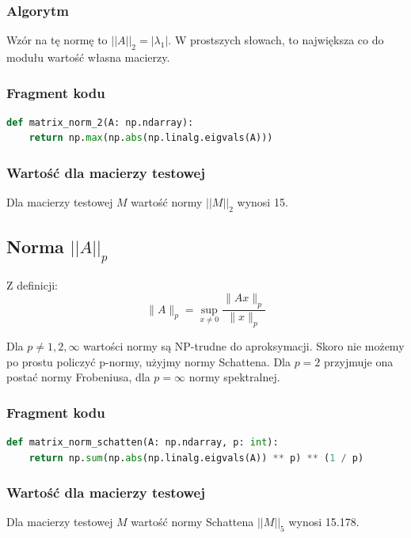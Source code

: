 \documentclass[a4paper]{article}
\begin{document}
\subsubsection{Algorytm}
Wzór na tę normę to
$||A||_2 = |{\lambda_{1}}|$. W prostszych słowach, to największa
co do modułu wartość własna macierzy.

\subsubsection{Fragment kodu}

\begin{lstlisting}[language=python]
def matrix_norm_2(A: np.ndarray):
    return np.max(np.abs(np.linalg.eigvals(A)))
\end{lstlisting}

\subsubsection{Wartość dla macierzy testowej}

Dla macierzy testowej $M$ wartość normy $||M||_2$ wynosi 15.

\subsection{Norma $||A||_p$}

Z definicji:
\[
\|A\|_p = \sup_{x \neq 0} \frac{\|Ax\|_p}{\|x\|_p}
\]

Dla $ p \neq 1, 2, \infty$ wartości normy są NP-trudne do aproksymacji. Skoro nie możemy po prostu policzyć p-normy, użyjmy normy Schattena. Dla $p=2$ przyjmuje ona postać normy Frobeniusa, dla $p=\infty$ normy spektralnej.

\subsubsection{Fragment kodu}

\begin{lstlisting}[language=python]
def matrix_norm_schatten(A: np.ndarray, p: int):
    return np.sum(np.abs(np.linalg.eigvals(A)) ** p) ** (1 / p)
\end{lstlisting}

\subsubsection{Wartość dla macierzy testowej}

Dla macierzy testowej $M$ wartość normy Schattena $||M||_5$ wynosi 15.178.
\end{document}
